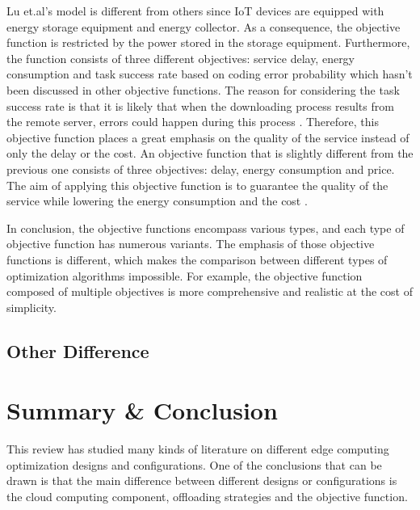 \documentclass[a4paper,11pt]{article}
\begin{document}
Lu et.al's model is different from others since IoT devices are equipped with energy storage equipment and energy collector. As a consequence, the objective function is restricted by the power stored in the storage equipment. Furthermore, the function consists of three different objectives: service delay, energy consumption and task success rate based on coding error probability which hasn't been discussed in other objective functions. The reason for considering the task success rate is that it is likely that when the downloading process results from the remote server, errors could happen during this process 
\cite{energy_objective}. Therefore, this objective function places a great emphasis on the quality of the service instead of only the delay or the cost. An objective function that is slightly different from the previous one consists of three objectives: delay, energy consumption and price. The aim of applying this objective function is to guarantee the quality of the service while lowering the energy consumption and the cost \cite{user_central}. \newline

In conclusion, the objective functions encompass various types, and each type of objective function has numerous variants. The emphasis of those objective functions is different, which makes the comparison between different types of optimization algorithms impossible. For example, the objective function composed of multiple objectives is more comprehensive and realistic at the cost of simplicity. 





\subsection{Other Difference}


\section{Summary \& Conclusion}
This review has studied many kinds of literature on different edge computing optimization designs and configurations. One of the conclusions that can be drawn is that the main difference between different designs or configurations is the cloud computing component, offloading strategies and the objective function. \newline
\end{document}
